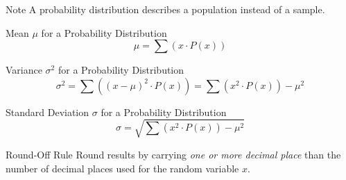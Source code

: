 \documentclass{beamer}
\newcommand{\prob}[1]{P\left(#1\right)}
\begin{document}
\begin{frame}
\begin{block}{Note}
A probability distribution describes a population instead of a sample.
\end{block}\pause

\begin{block}{Mean $\mu$ for a Probability Distribution}
\begin{equation*}
\mu = \sum\left(x\cdot\prob{x}\right)
\end{equation*}
\end{block}\pause

\begin{block}{Variance $\sigma^2$ for a Probability Distribution}
\begin{equation*}
\sigma^2=\sum\left({(x-\mu)}^2\cdot\prob{x}\right)=\sum\left(x^2\cdot\prob{x}\right)-\mu^2
\end{equation*}
\end{block}\pause

\begin{block}{Standard Deviation $\sigma$ for a Probability Distribution}
\begin{equation*}
\sigma=\sqrt{\sum\left(x^2\cdot\prob{x}\right)-\mu^2}
\end{equation*}
\end{block}\pause

\begin{block}{Round-Off Rule}
Round results by carrying \emph{one or more decimal place} than the number of decimal places used for the random variable $x$.
\end{block}
\end{frame}
\end{document}

